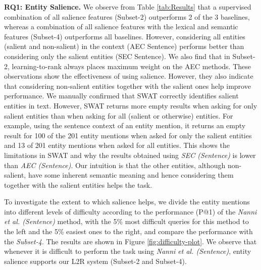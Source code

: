 \documentclass[sigconf,authordraft]{acmart}
\begin{document}
\textbf{RQ1: Entity Salience.}
We observe from Table \ref{tab:Results} that a supervised combination of all salience features (Subset-2) outperforms 2 of the 3 baselines, whereas a combination of all salience features with the lexical and semantic features (Subset-4) outperforms all baselines. However, considering all entities (salient and non-salient) in the context (AEC Sentence) performs better than considering only the salient entities (SEC Sentence). We also find that in Subset-2, learning-to-rank always places maximum weight on the AEC methods.
These observations show the effectiveness of using salience. However, they also indicate that considering non-salient entities together with the salient ones help improve performance. We manually confirmed that SWAT correctly identifies salient entities in text. However, SWAT returns more empty results when asking for only salient entities than when asking for all (salient or otherwise) entities. For example, using the sentence context of an entity mention, it returns an empty result for 100 of the 201 entity mentions when asked for only the salient entities and 13 of 201 entity mentions when asked for all  entities. This shows the limitations in SWAT and why the results obtained using \textit{SEC (Sentence)} is lower than \textit{AEC (Sentence)}.  Our intuition is that the other entities, although non-salient, have some inherent semantic meaning and hence considering them together with the salient entities helps the task. %

To investigate the extent to which salience helps, we divide the entity mentions  into different levels of difficulty according to the performance (P@1) of the \textit{Nanni et al. (Sentence)} method, with the 5\% most difficult queries for this method to the left and the 5\% easiest ones to the right, and compare the performance with the \textit{Subset-4}. The results are shown in Figure \ref{fig:difficulty-plot}. We observe that whenever it is difficult to perform the task using \textit{Nanni et al. (Sentence)}, entity salience supports our L2R system (Subset-2 and Subset-4).
\end{document}

